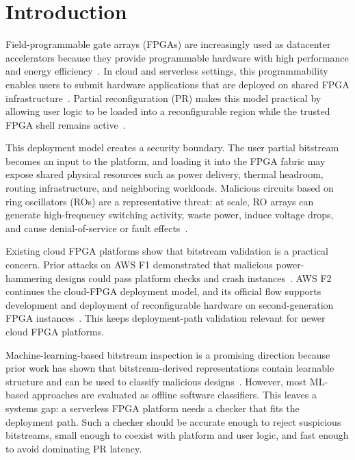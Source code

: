 \chapter{Introduction}
\label{sec:introduction}

Field-programmable gate arrays (FPGAs) are increasingly used as datacenter accelerators because they provide programmable hardware with high performance and energy efficiency~\cite{caulfield2016cloud,chung2018brainwave,bobda2022future,wang2022fpga}. In cloud and serverless settings, this programmability enables users to submit hardware applications that are deployed on shared FPGA infrastructure~\cite{mainas2025f3}. Partial reconfiguration (PR) makes this model practical by allowing user logic to be loaded into a reconfigurable region while the trusted FPGA shell remains active~\cite{korolija2020os,ramhorst2025coyote}.

This deployment model creates a security boundary. The user partial bitstream becomes an input to the platform, and loading it into the FPGA fabric may expose shared physical resources such as power delivery, thermal headroom, routing infrastructure, and neighboring workloads. Malicious circuits based on ring oscillators (ROs) are a representative threat: at scale, RO arrays can generate high-frequency switching activity, waste power, induce voltage drops, and cause denial-of-service or fault effects~\cite{gnad2017voltage,la2020fpgadefender,la2021denial,provelengios2020power,boutros2020neighbors}.

Existing cloud FPGA platforms show that bitstream validation is a practical concern. Prior attacks on AWS F1 demonstrated that malicious power-hammering designs could pass platform checks and crash instances~\cite{la2021denial}. AWS F2 continues the cloud-FPGA deployment model, and its official flow supports development and deployment of reconfigurable hardware on second-generation FPGA instances~\cite{awsF2Docs}. This keeps deployment-path validation relevant for newer cloud FPGA platforms.

Machine-learning-based bitstream inspection is a promising direction because prior work has shown that bitstream-derived representations contain learnable structure and can be used to classify malicious designs~\cite{rettkowski2019inspection,chaudhuri2022detection,chaudhuri2023criticality,elnaggar2023learning,palumbo2022trojan}. However, most ML-based approaches are evaluated as offline software classifiers. This leaves a systems gap: a serverless FPGA platform needs a checker that fits the deployment path. Such a checker should be accurate enough to reject suspicious bitstreams, small enough to coexist with platform and user logic, and fast enough to avoid dominating PR latency.

